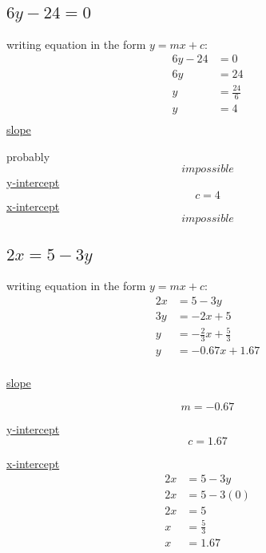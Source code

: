 \documentclass{article}
\begin{document}
\subsection{$6y-24=0$}
writing equation in the form $y=mx+c$:
$$
    \begin{aligned}
        6y-24 & = 0            \\
        6y    & = 24           \\
        y     & = \frac{24}{6} \\
        y     & = 4            \\
    \end{aligned}
$$
\underline{slope}

probably
$$
    impossible
$$
\underline{y-intercept}
$$
    c = 4
$$
\underline{x-intercept}
$$
    impossible
$$
\subsection{$2x=5-3y$}
writing equation in the form $y=mx+c$:
$$
    \begin{aligned}
        2x & = 5 - 3y                      \\
        3y & = -2x + 5                     \\
        y  & = -\frac{2}{3}x + \frac{5}{3} \\
        y  & = -0.67x + 1.67               \\
    \end{aligned}
$$

\underline{slope}

$$
    m=-0.67
$$

\underline{y-intercept}
$$
    c = 1.67
$$

\underline{x-intercept}
$$
    \begin{aligned}
        2x & = 5 - 3y      \\
        2x & = 5 - 3(0)    \\
        2x & = 5           \\
        x  & = \frac{5}{3} \\
        x  & = 1.67        \\
    \end{aligned}
$$
\end{document}
